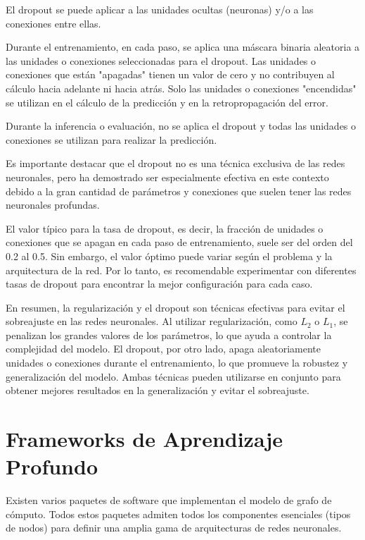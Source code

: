 El dropout  se puede aplicar a las unidades ocultas (neuronas) y/o a las conexiones entre ellas.

Durante el entrenamiento, en cada paso, se aplica una máscara binaria aleatoria a las unidades o conexiones seleccionadas para el dropout. Las unidades o conexiones que están "apagadas" tienen un valor de cero y no contribuyen al cálculo hacia adelante ni hacia atrás. Solo las unidades o conexiones "encendidas" se utilizan en el cálculo de la predicción y en la retropropagación del error.

Durante la inferencia o evaluación, no se aplica el dropout y todas las unidades o conexiones se utilizan para realizar la predicción.

Es importante destacar que el dropout no es una técnica exclusiva de las redes neuronales, pero ha demostrado ser especialmente efectiva en este contexto debido a la gran cantidad de parámetros y conexiones que suelen tener las redes neuronales profundas.

El valor típico para la tasa de dropout, es decir, la fracción de unidades o conexiones que se apagan en cada paso de entrenamiento, suele ser del orden del 0.2 al 0.5. Sin embargo, el valor óptimo puede variar según el problema y la arquitectura de la red. Por lo tanto, es recomendable experimentar con diferentes tasas de dropout para encontrar la mejor configuración para cada caso.

En resumen, la regularización y el dropout son técnicas efectivas para evitar el sobreajuste en las redes neuronales. Al utilizar regularización, como $L_2$ o $L_1$, se penalizan los grandes valores de los parámetros, lo que ayuda a controlar la complejidad del modelo. El dropout, por otro lado, apaga aleatoriamente unidades o conexiones durante el entrenamiento, lo que promueve la robustez y generalización del modelo. Ambas técnicas pueden utilizarse en conjunto para obtener mejores resultados en la generalización y evitar el sobreajuste.



\section{Frameworks de Aprendizaje Profundo}
Existen varios paquetes de software que implementan el modelo de grafo de cómputo. Todos estos paquetes admiten todos los componentes esenciales (tipos de nodos) para definir una amplia gama de arquitecturas de redes neuronales.

